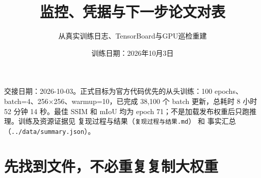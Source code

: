 \documentclass[UTF8,11pt,a4paper,fontset=windows]{ctexart}
\title{监控、凭据与下一步论文对表}
\author{从真实训练日志、TensorBoard与GPU巡检重建}
\date{训练日期：2026年10月3日}
\begin{document}
\maketitle
\tableofcontents
\clearpage

交接日期：2026-10-03。正式目标为官方代码优先的从头训练：100 epochs、batch=4、256×256、warmup=10，已完成 38,100 个 batch 更新，总耗时 8 小时 52 分钟 14 秒。最佳 SSIM 和 mIoU 均为 epoch 71；不是加载发布权重后只跑推理。训练及资源证据见 复现过程与结果（\texttt{复现过程与结果.\allowbreak{}md}） 和 事实汇总（\texttt{.\allowbreak{}.\allowbreak{}/\allowbreak{}data/\allowbreak{}summ\allowbreak{}ary.\allowbreak{}json}）。

\section{先找到文件，不必重复复制大权重}
\end{document}
